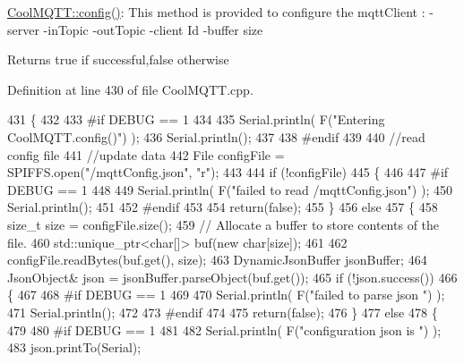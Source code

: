 \hyperlink{class_cool_m_q_t_t_a6571671781a505feca9a8a56e256c6bc}{Cool\+M\+Q\+T\+T\+::config()}\+: This method is provided to configure the mqtt\+Client \+: -\/server -\/in\+Topic -\/out\+Topic -\/client Id -\/buffer size

\begin{DoxyReturn}{Returns}
true if successful,false otherwise 
\end{DoxyReturn}


Definition at line 430 of file Cool\+M\+Q\+T\+T.\+cpp.


\begin{DoxyCode}
431 \{
432 
433 \textcolor{preprocessor}{#if DEBUG == 1 }
434 
435     Serial.println( F(\textcolor{stringliteral}{"Entering CoolMQTT.config()"}) );
436     Serial.println();
437 
438 \textcolor{preprocessor}{#endif}
439 
440     \textcolor{comment}{//read config file}
441     \textcolor{comment}{//update data}
442     File configFile = SPIFFS.open(\textcolor{stringliteral}{"/mqttConfig.json"}, \textcolor{stringliteral}{"r"});
443 
444     \textcolor{keywordflow}{if} (!configFile) 
445     \{
446     
447 \textcolor{preprocessor}{    #if DEBUG == 1 }
448 
449         Serial.println( F(\textcolor{stringliteral}{"failed to read /mqttConfig.json"}) );
450         Serial.println();
451 
452 \textcolor{preprocessor}{    #endif}
453 
454         \textcolor{keywordflow}{return}(\textcolor{keyword}{false});
455     \}
456     \textcolor{keywordflow}{else}
457     \{
458         \textcolor{keywordtype}{size\_t} size = configFile.size();
459         \textcolor{comment}{// Allocate a buffer to store contents of the file.}
460         std::unique\_ptr<char[]> buf(\textcolor{keyword}{new} \textcolor{keywordtype}{char}[size]);
461 
462         configFile.readBytes(buf.get(), size);
463         DynamicJsonBuffer jsonBuffer;
464         JsonObject& json = jsonBuffer.parseObject(buf.get());
465         \textcolor{keywordflow}{if} (!json.success()) 
466         \{
467         
468 \textcolor{preprocessor}{        #if DEBUG == 1 }
469 
470             Serial.println( F(\textcolor{stringliteral}{"failed to parse json "}) );
471             Serial.println();
472         
473 \textcolor{preprocessor}{        #endif}
474             
475             \textcolor{keywordflow}{return}(\textcolor{keyword}{false});
476         \} 
477         \textcolor{keywordflow}{else}
478         \{
479         
480 \textcolor{preprocessor}{        #if DEBUG == 1 }
481         
482             Serial.println( F(\textcolor{stringliteral}{"configuration json is "}) );
483             json.printTo(Serial);

\end{DoxyCode}
